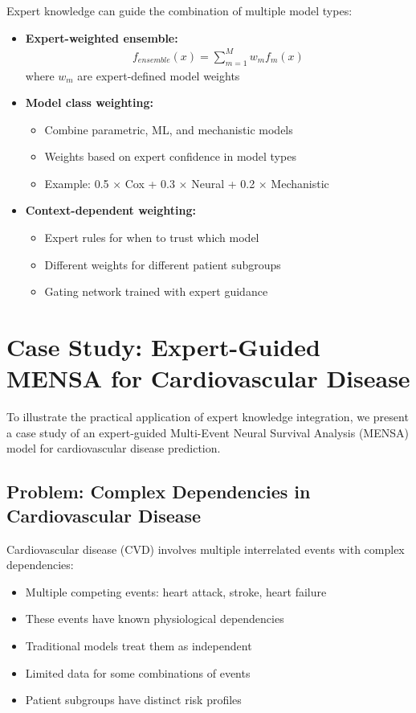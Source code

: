 Expert knowledge can guide the combination of multiple model types:

\begin{itemize}
    \item \textbf{Expert-weighted ensemble:}
    \begin{align}
        f_{ensemble}(x) = \sum_{m=1}^M w_m f_m(x)
    \end{align}
    where $w_m$ are expert-defined model weights

    \item \textbf{Model class weighting:}
    \begin{itemize}
        \item Combine parametric, ML, and mechanistic models
        \item Weights based on expert confidence in model types
        \item Example: 0.5 × Cox + 0.3 × Neural + 0.2 × Mechanistic
    \end{itemize}

    \item \textbf{Context-dependent weighting:}
    \begin{itemize}
        \item Expert rules for when to trust which model
        \item Different weights for different patient subgroups
        \item Gating network trained with expert guidance
    \end{itemize}
\end{itemize}

\section{Case Study: Expert-Guided MENSA for Cardiovascular Disease}

To illustrate the practical application of expert knowledge integration, we present a case study of an expert-guided Multi-Event Neural Survival Analysis (MENSA) model for cardiovascular disease prediction.

\subsection{Problem: Complex Dependencies in Cardiovascular Disease}

Cardiovascular disease (CVD) involves multiple interrelated events with complex dependencies:

\begin{itemize}
    \item Multiple competing events: heart attack, stroke, heart failure
    \item These events have known physiological dependencies
    \item Traditional models treat them as independent
    \item Limited data for some combinations of events
    \item Patient subgroups have distinct risk profiles
\end{itemize}

